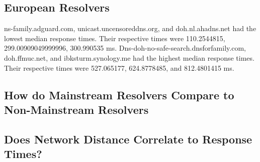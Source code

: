\subsection{European Resolvers}
ns-family.adguard.com, unicast.uncensoreddns.org, and doh.nl.ahadns.net had the lowest median response times.
Their respective times were 110.2544815, 299.00909049999996, 300.990535 ms. 
Dns-doh-no-safe-search.dnsforfamily.com, doh.ffmuc.net, and ibksturm.synology.me had the highest median response times. 
Their respective times were 527.065177, 624.8778485, and 812.4801415 ms. 

\subsection{How do Mainstream Resolvers Compare to Non-Mainstream Resolvers}

\subsection{Does Network Distance Correlate to Response Times?}






















